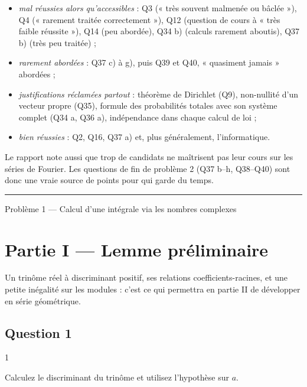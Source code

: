 \documentclass[11pt,a4paper]{article}
\providecommand{\tightlist}{\setlength{\itemsep}{0pt}\setlength{\parskip}{0pt}}
\begin{document}
\begin{itemize}
\tightlist
\item
  \emph{mal réussies alors qu'accessibles} : Q3 (« très souvent malmenée ou bâclée »), Q4 (« rarement traitée correctement »), Q12 (question de cours à « très faible réussite »), Q14 (peu abordée), Q34 b) (calculs rarement aboutis), Q37 b) (très peu traitée) ;
\item
  \emph{rarement abordées} : Q37 c) à g), puis Q39 et Q40, « quasiment jamais » abordées ;
\item
  \emph{justifications réclamées partout} : théorème de Dirichlet (Q9), non-nullité d'un vecteur propre (Q35), formule des probabilités totales avec son système complet (Q34 a, Q36 a), indépendance dans chaque calcul de loi ;
\item
  \emph{bien réussies} : Q2, Q16, Q37 a) et, plus généralement, l'informatique.
\end{itemize}

Le rapport note aussi que trop de candidats ne maîtrisent pas leur cours sur les séries de Fourier. Les questions de fin de problème 2 (Q37 b--h, Q38--Q40) sont donc une vraie source de points pour qui garde du temps.

\begin{center}\rule{0.5\linewidth}{0.5pt}\end{center}

Problème 1 --- Calcul d'une intégrale via les nombres complexes

\hypertarget{partie-i-lemme-pruxe9liminaire}{%
\section{Partie I --- Lemme préliminaire}\label{partie-i-lemme-pruxe9liminaire}}

Un trinôme réel à discriminant positif, ses relations coefficients-racines, et une petite inégalité sur les modules : c'est ce qui permettra en partie II de développer en série géométrique.

\hypertarget{question-1}{%
\subsection{Question 1}\label{question-1}}

\begin{indication}{1}

Calculez le discriminant du trinôme et utilisez l'hypothèse sur \(a\).

\end{indication}
\end{document}

